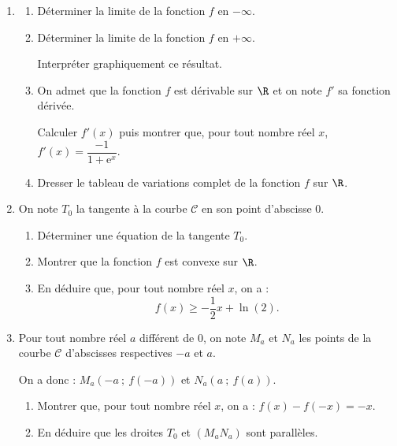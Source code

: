 \begin{enumerate}
\item 
	\begin{enumerate}
		\item Déterminer la limite de la fonction $f$ en $-\infty$.
		\item Déterminer la limite de la fonction $f$ en $+ \infty$.
		
Interpréter graphiquement ce résultat.
		\item On admet que la fonction $f$ est dérivable sur $\R$ et on note $f'$ sa fonction dérivée.
		
Calculer $f'(x)$ puis montrer que, pour tout nombre réel $x$,\: $f'(x) = \dfrac{-1}{1 + \text{e}^x}$.
		\item Dresser le tableau de variations complet de la fonction $f$ sur $\R$.
	\end{enumerate}	
\item On note $T_0$ la tangente à la courbe $\mathcal{C}$ en son point d'abscisse $0$.
	\begin{enumerate}
		\item Déterminer une équation de la tangente $T_0$.
		\item Montrer que la fonction $f$ est convexe sur $\R$.
		\item En déduire que, pour tout nombre réel $x$, on a : 
		\[f(x) \geqslant  - \dfrac12x + \ln (2).\]
		\end{enumerate}	
\item Pour tout nombre réel $a$ différent de 0, on note $M_a$ et $N_a$ les points de la courbe $\mathcal{C}$ d'abscisses respectives $-a$ et $a$. 

On a donc : $M_a\left(-a~;~ f(-a)\right)$ et $N_a\left(a~;~ f(a)\right)$.
	\begin{enumerate}
		\item Montrer que, pour tout nombre réel $x$, on a : $f(x) - f(-x) = - x$.
		\item En déduire que les droites $T_0$ et $\left(M_aN_a\right)$ sont parallèles.
	\end{enumerate}
\end{enumerate}
